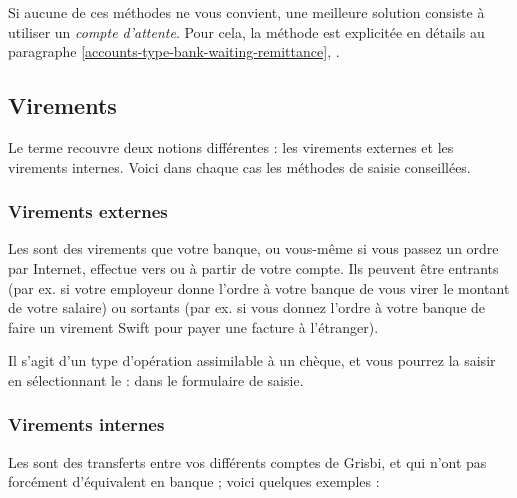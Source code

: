 Si aucune de ces méthodes ne vous convient, une meilleure solution consiste à utiliser un \emph{compte d'attente}. Pour cela, la méthode est explicitée en détails au paragraphe \vref{accounts-type-bank-waiting-remittance}, . 


\subsection{Virements\label{transactions-new-transfer}}


Le terme  recouvre deux notions différentes : les virements externes et les virements internes. Voici dans chaque cas les méthodes de saisie conseillées.

\subsubsection{Virements externes\label{transactions-new-transfer-external}}

Les  sont des virements que votre banque, ou vous-même si vous passez un ordre par Internet, effectue vers ou à partir de votre compte. Ils peuvent être entrants (par ex. si votre employeur donne l'ordre à votre banque de vous virer le montant de votre salaire) ou sortants (par ex. si vous donnez l'ordre à votre banque de faire un virement Swift pour payer une facture à l'étranger).

Il s'agit d'un type d'opération assimilable à un chèque, et vous pourrez la saisir en sélectionnant le  :  dans le formulaire de saisie.


\subsubsection{Virements internes\label{transactions-new-transfer-internal}}

Les  sont des transferts entre vos différents comptes de Grisbi, et qui n'ont pas forcément d'équivalent en banque ; voici quelques exemples :

